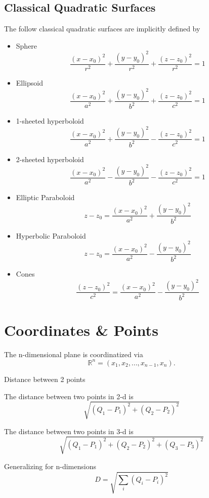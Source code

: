 \subsection{Classical Quadratic Surfaces}

\begin{framed}
The follow classical quadratic surfaces are implicitly defined by 
   \begin{itemize}
      \item Sphere \[
        \frac{(x-x_0)^2}{r^2} + \frac{(y - y_0)^2}{r^2} + \frac{(z-z_0)^2}{r^2} = 1
      \] 
   \item Ellipsoid \[
     \frac{(x-x_0)^2}{a^2} + \frac{(y - y_0)^2}{b^2} + \frac{(z-z_0)^2}{c^2} = 1
   \] 
   \item 1-sheeted hyperboloid \[
     \frac{(x-x_0)^2}{a^2} + \frac{(y - y_0)^2}{b^2} - \frac{(z-z_0)^2}{c^2} = 1
   \] 
   \item 2-sheeted hyperboloid \[
     \frac{(x-x_0)^2}{a^2} - \frac{(y - y_0)^2}{b^2} - \frac{(z-z_0)^2}{c^2} = 1
   \] 
   \item Elliptic Paraboloid \[
     z - z_0 = \frac{(x-x_0)^2}{a^2} + \frac{(y - y_0)^2}{b^2}
   \] 
   \item Hyperbolic Paraboloid \[
     z - z_0 = \frac{(x-x_0)^2}{a^2} - \frac{(y - y_0)^2}{b^2}
   \] 
   \item Cones \[
     \frac{(z-z_0)^2}{c^2}= \frac{(x-x_0)^2}{a^2} - \frac{(y - y_0)^2}{b^2}
   \] 
     
   \end{itemize}
   
  
\end{framed}


\section{Coordinates \& Points}

The n-dimensional plane is coordinatized via \[
   \mathbb{R}^n = {(x_1, x_2, ..., x_{n-1}, x_n)} 
.\] 

Distance between 2 points 
\begin{framed}
   The distance between two points in 2-d is \[
      \sqrt{(Q_1 - P_1)^2 + (Q_2-P_2)^2}
   \] 

   The distance between two points in 3-d is \[
      \sqrt{(Q_1 - P_1)^2 + (Q_2-P_2)^2 + (Q_3-P_3)^2}
   \] 

   Generalizing for n-dimensions \[
      D = \sqrt{\sum_{i}(Q_i - P_i)^2}
   \] 
\end{framed}



